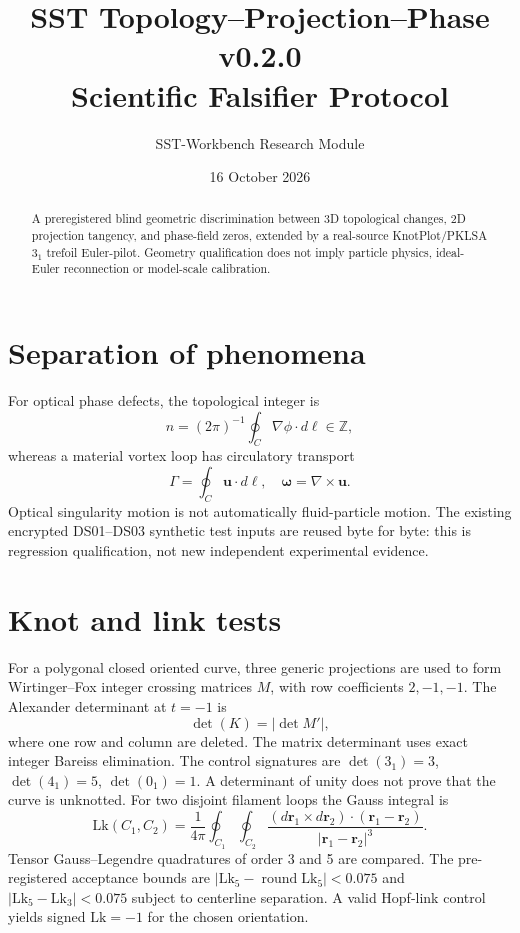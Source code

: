\documentclass[11pt,a4paper]{article}
\title{SST Topology--Projection--Phase v0.2.0\\Scientific Falsifier Protocol}
\author{SST-Workbench Research Module}
\date{16 October 2026}
\begin{document}
\maketitle
\begin{abstract}
A preregistered blind geometric discrimination between 3D topological changes,
2D projection tangency, and phase-field zeros, extended by a real-source
KnotPlot/PKLSA $3_1$ trefoil Euler-pilot. Geometry qualification does not imply
particle physics, ideal-Euler reconnection or model-scale calibration.
\end{abstract}
\section{Separation of phenomena}
For optical phase defects, the topological integer is
\begin{equation}n=(2\pi)^{-1}\oint_C\nabla\phi\cdot d\boldsymbol{\ell}\in\mathbb{Z},\end{equation}
whereas a material vortex loop has circulatory transport
\begin{equation}\Gamma=\oint_C\mathbf{u}\cdot d\boldsymbol{\ell},\quad
 \boldsymbol{\omega}=\nabla\times\mathbf{u}.\end{equation}
Optical singularity motion is not automatically fluid-particle motion.
The existing encrypted DS01--DS03 synthetic test inputs are reused byte for byte:
this is regression qualification, not new independent experimental evidence.
\section{Knot and link tests}
For a polygonal closed oriented curve, three generic projections are used to
form Wirtinger--Fox integer crossing matrices $M$, with row coefficients
$2,-1,-1$. The Alexander determinant at $t=-1$ is
\begin{equation}\det(K)=|\det M'|,\end{equation}
where one row and column are deleted. The matrix determinant uses exact integer
Bareiss elimination. The control signatures are
$\det(3_1)=3$, $\det(4_1)=5$, $\det(0_1)=1$.
A determinant of unity does not prove that the curve is unknotted.
For two disjoint filament loops the Gauss integral is
\begin{equation}
\mathrm{Lk}(C_1,C_2)=\frac{1}{4\pi}\oint_{C_1}\oint_{C_2}
\frac{(d\mathbf{r}_1\times d\mathbf{r}_2)\cdot(\mathbf{r}_1-\mathbf{r}_2)}
 {|\mathbf{r}_1-\mathbf{r}_2|^3}.
\end{equation}
Tensor Gauss--Legendre quadratures of order 3 and 5 are compared. The
pre-registered acceptance bounds are $|\mathrm{Lk}_5-\operatorname{round}\mathrm{Lk}_5|<0.075$
and $|\mathrm{Lk}_5-\mathrm{Lk}_3|<0.075$ subject to centerline separation.
A valid Hopf-link control yields signed $\mathrm{Lk}=-1$ for the chosen orientation.
\end{document}
